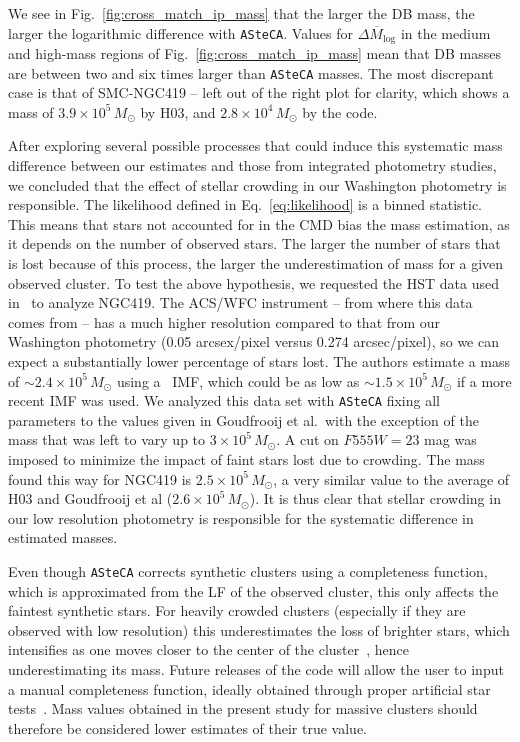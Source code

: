 \documentclass{aa}
\begin{document}
We see in Fig.~\ref{fig:cross_match_ip_mass} that the larger the DB mass, the
larger the logarithmic difference with \texttt{ASteCA}. Values for
$\overline{\Delta M_{\log}}$ in the medium and high-mass regions of
Fig.~\ref{fig:cross_match_ip_mass} mean that DB masses are
between two and six times larger than \texttt{ASteCA} masses.
%
The most discrepant case is that of SMC-NGC419 -- left out of
the right plot for clarity, which shows a mass of $3.9{\times}10^5\,M_{\odot}$
by H03, and $2.8{\times}10^4\,M_{\odot}$ by the code.

After exploring several possible processes that could induce this systematic
mass difference between our estimates and those from integrated photometry
studies, we concluded that the effect of stellar crowding
in our Washington photometry is responsible.
%
The likelihood defined in Eq.~\ref{eq:likelihood} is a binned statistic. This
means that stars not accounted for in the CMD bias the mass estimation,
as it depends on the number of observed stars. The larger the number of stars that is
lost because of this process, the larger the underestimation of mass for a given
observed cluster.
%
To test the above hypothesis, we requested the HST data used
in~\cite{Goudfrooij_2014} to analyze NGC419. The ACS/WFC instrument -- from
where this data comes from -- has a much higher resolution compared to that from
our Washington photometry (0.05 arcsex/pixel versus 0.274 arcsec/pixel), so we
can expect a substantially lower percentage of stars lost.
The authors estimate a mass of ${\sim}2.4{\times}10^5\,M_{\odot}$ using
a~\cite{Salpeter_1955} IMF, which could be as low as
${\sim}1.5{\times}10^5\,M_{\odot}$ if a more recent IMF was used.
We analyzed this data set with \texttt{ASteCA} fixing all parameters to the
values given in Goudfrooij et al.\ with the exception of the
mass that was left to vary up to $3{\times}10^5\,M_{\odot}$. A cut on $F555W
{=}23$ mag was imposed to minimize the impact of faint stars lost due to
crowding.
%
The mass found this way for NGC419 is $2.5{\times}10^5\,M_{\odot}$, a
very similar value to the average of H03 and Goudfrooij et al
($2.6{\times}10^5\,M_{\odot}$).
%
It is thus clear that stellar crowding in our low resolution photometry is
responsible for the systematic difference in estimated masses.

Even though \texttt{ASteCA} corrects synthetic clusters using a
completeness function, which is approximated from the LF of the observed cluster, this
only affects the faintest synthetic stars. For heavily crowded clusters 
(especially if they are observed with low resolution) this underestimates the
loss of brighter stars, which intensifies as one moves closer to the center of
the cluster~\citep{Mateo_1988}, hence underestimating its mass.
Future releases of the code will allow the user to input a manual completeness
function, ideally obtained through proper artificial star
tests~\citep[see, e.g.,][]{Aparicio_Gallart_1995}.
%
Mass values obtained in the present study for massive clusters should therefore
be considered lower estimates of their true value.
\end{document}
